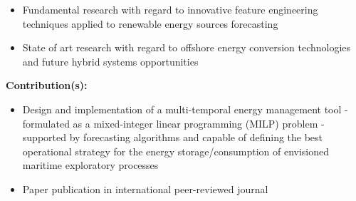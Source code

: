 \documentclass{mycv}
\begin{document}
\begin{myitemize}
		\begin{itemize}[itemsep=1px]
			\item Fundamental research with regard to innovative feature engineering techniques applied to renewable energy sources forecasting
			\item State of art research with regard to offshore energy conversion technologies and future hybrid systems opportunities
		\end{itemize}
		
		\vspace{0.2cm}
		\textbf{Contribution(s):}
		
		\begin{itemize}[itemsep=1px]
			\item Design and implementation of a multi-temporal energy management tool - formulated as a mixed-integer linear programming (MILP) problem - supported by forecasting algorithms and capable of defining the best operational strategy for the energy storage/consumption of envisioned maritime exploratory processes
			\item Paper publication in international peer-reviewed journal
		\end{itemize}
		


		
\end{myitemize}


\end{document}
